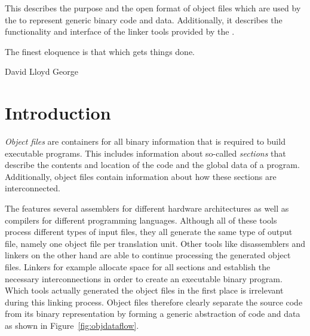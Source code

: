 




\renewcommand{\seeobject}{}

{This \documentation{} describes the purpose and the open format of object files which are used by the \ecs{} to represent generic binary code and data.
Additionally, it describes the functionality and interface of the linker tools provided by the \ecs{}.}

\epigraph{The finest eloquence is that which gets things done.}{David Lloyd George}

\section{Introduction}

\emph{Object files} are containers for all binary information that is required to build executable programs.
This includes information about so-called \emph{sections} that describe the contents and location of the code and the global data of a program.
Additionally, object files contain information about how these sections are interconnected.

The \ecs{} features several assemblers for different hardware architectures as well as compilers for different programming languages.
Although all of these tools process different types of input files, they all generate the same type of output file, namely one object file per translation unit.
Other tools like disassemblers and linkers on the other hand are able to continue processing the generated object files.
Linkers for example allocate space for all sections and establish the necessary interconnections in order to create an executable binary program.
Which tools actually generated the object files in the first place is irrelevant during this linking process.
Object files therefore clearly separate the source code from its binary representation by forming a generic abstraction of code and data as shown in Figure~\ref{fig:objdataflow}.

